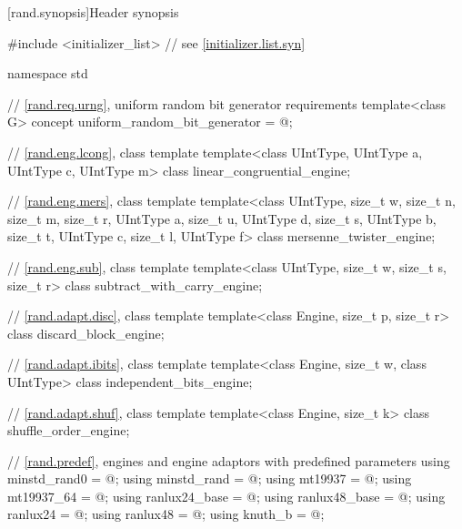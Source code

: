 

[rand.synopsis]{Header  synopsis}


\begin{codeblock}
#include <initializer_list>     // see \ref{initializer.list.syn}

namespace std {
  // \ref{rand.req.urng}, uniform random bit generator requirements
  template<class G>
    concept uniform_random_bit_generator = @\seebelow@;

  // \ref{rand.eng.lcong}, class template 
  template<class UIntType, UIntType a, UIntType c, UIntType m>
    class linear_congruential_engine;

  // \ref{rand.eng.mers}, class template 
  template<class UIntType, size_t w, size_t n, size_t m, size_t r,
           UIntType a, size_t u, UIntType d, size_t s,
           UIntType b, size_t t,
           UIntType c, size_t l, UIntType f>
    class mersenne_twister_engine;

  // \ref{rand.eng.sub}, class template 
  template<class UIntType, size_t w, size_t s, size_t r>
    class subtract_with_carry_engine;

  // \ref{rand.adapt.disc}, class template 
  template<class Engine, size_t p, size_t r>
    class discard_block_engine;

  // \ref{rand.adapt.ibits}, class template 
  template<class Engine, size_t w, class UIntType>
    class independent_bits_engine;

  // \ref{rand.adapt.shuf}, class template 
  template<class Engine, size_t k>
    class shuffle_order_engine;

  // \ref{rand.predef}, engines and engine adaptors with predefined parameters
  using minstd_rand0  = @\seebelow@;
  using minstd_rand   = @\seebelow@;
  using mt19937       = @\seebelow@;
  using mt19937_64    = @\seebelow@;
  using ranlux24_base = @\seebelow@;
  using ranlux48_base = @\seebelow@;
  using ranlux24      = @\seebelow@;
  using ranlux48      = @\seebelow@;
  using knuth_b       = @\seebelow@;

}
\end{codeblock}

